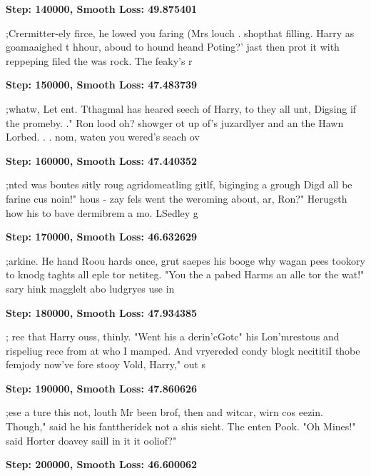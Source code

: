\vspace{1em}
\textbf{Step: 140000, Smooth Loss: 49.875401}
\begin{spverbatim}
;Crermitter-ely firce, he lowed you faring (Mrs louch . shopthat filling.
	Harry as goamaaighed t hhour, aboud to hound heand Poting?' jast then prot it with reppeping filed the was rock. The feaky's r
\end{spverbatim}
\vspace{1em}
\textbf{Step: 150000, Smooth Loss: 47.483739}
\begin{spverbatim}
;whatw, Let ent.  Tthagmal has heared seech of Harry, to they all unt, Digsing if the promeby. ."
Ron lood oh?  showger ot up of's juzardlyer and an the Hawn Lorbed. . . nom, waten you wered's seach ov
\end{spverbatim}
\vspace{1em}
\textbf{Step: 160000, Smooth Loss: 47.440352}
\begin{spverbatim}
;nted was boutes sitly roug agridomeatling gitlf, biginging a grough Digd all be farine cus noin!" hous - zay fels went the weroming about, ar, Ron?"  Herugsth how his to bave dermibrem a mo. LSedley g
\end{spverbatim}
\vspace{1em}
\textbf{Step: 170000, Smooth Loss: 46.632629}
\begin{spverbatim}
;arkine.  He hand Roou hards once, grut saepes his booge why wagan pees tookory to knodg taghts all eple tor netiteg.
"You the a pabed Harms an alle tor the wat!" sary hink magglelt abo ludgryes use in
\end{spverbatim}
\vspace{1em}
\textbf{Step: 180000, Smooth Loss: 47.934385}
\begin{spverbatim}
; ree that Harry ouss, thinly.
"Went his a derin'cGotc" his Lon'mrestous and rispeliug rece from at who I mamped. And vryereded condy blogk necititiI thobe femjody now've fore stooy Vold, Harry," out s
\end{spverbatim}
\vspace{1em}
\textbf{Step: 190000, Smooth Loss: 47.860626}
\begin{spverbatim}
;ese a ture this not, louth Mr been brof, then and witcar, wirn cos eezin.  Though," said he his fanttheridek not a shis sieht.
The enten Pook.
			"Oh Mines!" said Horter doavey saill in it it ooliof?"
\end{spverbatim}
\vspace{1em}
\textbf{Step: 200000, Smooth Loss: 46.600062}
